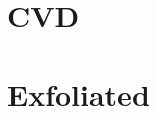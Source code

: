 \documentclass[../Matt_Gebert_Honours_Thesis.tex]{subfiles}
\begin{document}

\section{CVD}

\section{Exfoliated}
\end{document}
